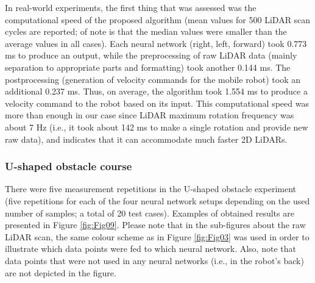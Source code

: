 In real-world experiments, the first thing that was assessed was the computational speed of the proposed algorithm (mean values for 500 LiDAR scan cycles are reported; of note is that the median values were smaller than the average values in all cases). Each neural network (right, left, forward) took 0.773 ms to produce an output, while the preprocessing of raw LiDAR data (mainly separation to appropriate parts and formatting) took another 0.144 ms. The postprocessing (generation of velocity commands for the mobile robot) took an additional 0.237 ms. Thus, on average, the algorithm took 1.554 ms to produce a velocity command to the robot based on its input. This computational speed was more than enough in our case since LiDAR maximum rotation frequency was about 7 Hz (i.e., it took about 142 ms to make a single rotation and provide new raw data), and indicates that it can accommodate much faster 2D LiDARs.

\subsubsection{U-shaped obstacle course}

There were five measurement repetitions in the U-shaped obstacle experiment (five repetitions for each of the four neural network setups depending on the used number of samples; a total of 20 test cases). Examples of obtained results are presented in Figure \ref{fig:Fig09}. Please note that in the sub-figures about the raw LiDAR scan, the same colour scheme as in Figure \ref{fig:Fig03} was used in order to illustrate which data points were fed to which neural network. Also, note that data points that were not used in any neural networks (i.e., in the robot's back) are not depicted in the figure.

